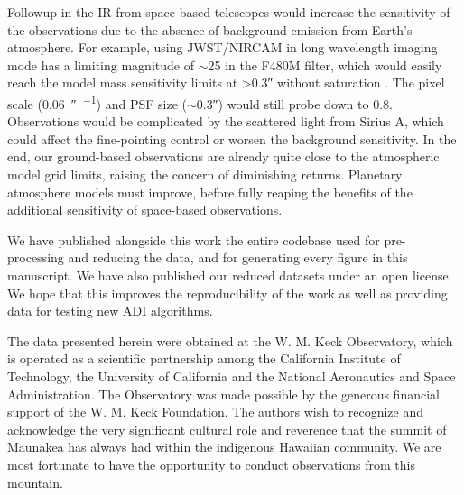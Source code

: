 \documentclass[twocolumn]{aastex631}
\begin{document}
Followup in the IR from space-based telescopes would increase the sensitivity of the observations due to the absence of background emission from Earth's atmosphere. For example, using JWST/NIRCAM in long wavelength imaging mode has a limiting magnitude of $\sim$25 in the F480M filter, which would easily reach the model mass sensitivity limits at \textgreater\ang{;;0.3} without saturation \citep{pontoppidan_pandeia_2016}. The pixel scale (\qty{0.06}{\arcsecond\per\pixel}) and PSF size ($\sim$\ang{;;0.3}) would still probe down to \qty{0.8}{\au}. Observations would be complicated by the scattered light from Sirius A, which could affect the fine-pointing control or worsen the background sensitivity. In the end, our ground-based observations are already quite close to the atmospheric model grid limits, raising the concern of diminishing returns. Planetary atmosphere models must improve, before fully reaping the benefits of the additional sensitivity of space-based observations.

We have published alongside this work the entire codebase used for pre-processing and reducing the data, and for generating every figure in this manuscript. We have also published our reduced datasets under an open license. We hope that this improves the reproducibility of the work as well as providing data for testing new ADI algorithms.

\begin{acknowledgements}
The data presented herein were obtained at the W. M. Keck Observatory, which is operated as a scientific partnership among the California Institute of Technology, the University of California and the National Aeronautics and Space Administration. The Observatory was made possible by the generous financial support of the W. M. Keck Foundation. The authors wish to recognize and acknowledge the very significant cultural role and reverence that the summit of Maunakea has always had within the indigenous Hawaiian community. We are most fortunate to have the opportunity to conduct observations from this mountain.
\end{acknowledgements}




{}

\end{document}

